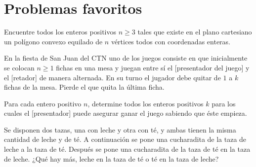 \chapter{Problemas favoritos}
\begin{problem}
Encuentre todos los enteros positivos $n\geq3$ tales que existe
en el plano cartesiano un polígono convexo equilado de $n$ vértices todos
con coordenadas enteras.
\end{problem}

\begin{problem}
En la fiesta de San Juan del CTN
uno de los juegos consiste en que
inicialmente se colocan $n \geq 1$ fichas en
una mesa y juegan entre sí el
	[presentador del juego] y
el [retador] de manera alternada.
En su turno el jugador
debe quitar de $1$ a $k$ fichas
de la mesa.
Pierde el que quita la última ficha.

Para cada entero positivo $n$,
determine todos los enteros positivos
$k$ para los cuales el [presentador]
puede asegurar ganar el juego
sabiendo que éste empieza.
\end{problem}

\begin{problem}
Se disponen dos tazas, una con leche y otra con té,
y ambas tienen la misma cantidad de leche y de té.
A continuación se pone una cucharadita de la taza de
leche a la taza de té. Después se pone una cucharadita
de la taza de té en la taza de leche.
¿Qué hay más, leche en la taza de té o té en la taza de leche?
\end{problem}
